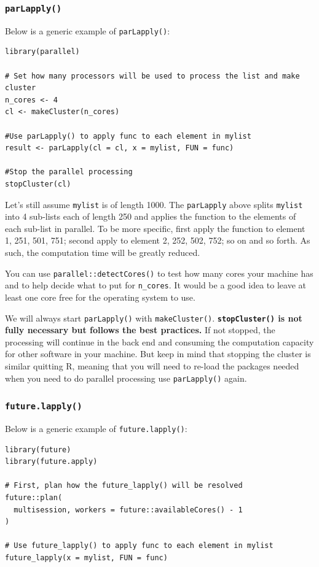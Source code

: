 \documentclass[
]{book}
\begin{document}
\subsubsection{\texorpdfstring{\texttt{parLapply()}}{parLapply()}}\label{parlapply}

Below is a generic example of \texttt{parLapply()}:

\begin{verbatim}
library(parallel)

# Set how many processors will be used to process the list and make cluster
n_cores <- 4
cl <- makeCluster(n_cores)

#Use parLapply() to apply func to each element in mylist
result <- parLapply(cl = cl, x = mylist, FUN = func)

#Stop the parallel processing
stopCluster(cl)
\end{verbatim}

Let's still assume \texttt{mylist} is of length 1000. The \texttt{parLapply} above splits \texttt{mylist} into 4 sub-lists each of length 250 and applies the function to the elements of each sub-list in parallel. To be more specific, first apply the function to element 1, 251, 501, 751; second apply to element 2, 252, 502, 752; so on and so forth. As such, the computation time will be greatly reduced.

You can use \texttt{parallel::detectCores()} to test how many cores your machine has and to help decide what to put for \texttt{n\_cores}. It would be a good idea to leave at least one core free for the operating system to use.

We will always start \texttt{parLapply()} with \texttt{makeCluster()}. \textbf{\texttt{stopCluster()} is not fully necessary but follows the best practices.} If not stopped, the processing will continue in the back end and consuming the computation capacity for other software in your machine. But keep in mind that stopping the cluster is similar quitting R, meaning that you will need to re-load the packages needed when you need to do parallel processing use \texttt{parLapply()} again.

\subsubsection{\texorpdfstring{\texttt{future.lapply()}}{future.lapply()}}\label{future.lapply}

Below is a generic example of \texttt{future.lapply()}:

\begin{verbatim}
library(future)
library(future.apply)

# First, plan how the future_lapply() will be resolved
future::plan(
  multisession, workers = future::availableCores() - 1
)

# Use future_lapply() to apply func to each element in mylist
future_lapply(x = mylist, FUN = func)
\end{verbatim}
\end{document}
